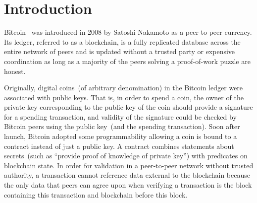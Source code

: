 \documentclass[]{llncs}   %
\begin{document}
\begin{abstract}

	
\end{abstract}

\section{Introduction}
\label{sec-intro}
 
Bitcoin~\cite{Nakamoto2008} was introduced in 2008 by Satoshi Nakamoto as a peer-to-peer currency. Its ledger, referred to as a blockchain, is a fully replicated database across the entire network of peers and is updated without a trusted
party or expensive coordination as long as a majority of the peers solving a proof-of-work puzzle are honest.

Originally, digital coins~(of arbitrary denomination) in the Bitcoin ledger were associated with public keys. That is, in order to spend a coin, the owner of the private key corresponding to the public key of the coin should provide a signature for a spending transaction, and validity of the signature could be checked by Bitcoin peers using the public key~(and the spending transaction).
Soon after launch, Bitcoin adopted some programmability allowing a coin is bound to a contract instead of just a public key. A contract combines statements about secrets~(such as ``provide proof of knowledge of private key'') with predicates on blockchain state. In order for validation in a peer-to-peer network without trusted authority, a transaction cannot reference data external to the blockchain because the only data that peers can agree upon when verifying a transaction is the block containing this transaction and blockchain before this block.
\end{document}
